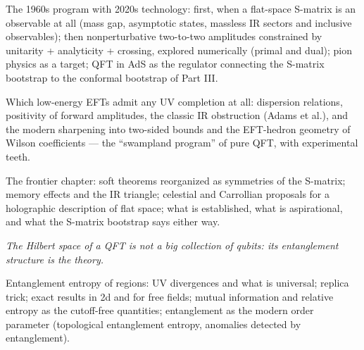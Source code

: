 The 1960s program with 2020s technology: first, when a flat-space S-matrix is an observable at all (mass gap, asymptotic states, massless IR sectors and inclusive observables); then nonperturbative two-to-two amplitudes constrained by unitarity + analyticity + crossing, explored numerically (primal and dual); pion physics as a target; QFT in AdS as the regulator connecting the S-matrix bootstrap to the conformal bootstrap of Part III.

Which low-energy EFTs admit any UV completion at all: dispersion relations, positivity of forward amplitudes, the classic IR obstruction (Adams et al.), and the modern sharpening into two-sided bounds and the EFT-hedron geometry of Wilson coefficients --- the ``swampland program'' of pure QFT, with experimental teeth.

The frontier chapter: soft theorems reorganized as symmetries of the S-matrix; memory effects and the IR triangle; celestial and Carrollian proposals for a holographic description of flat space; what is established, what is aspirational, and what the S-matrix bootstrap says either way.


\noin \emph{The Hilbert space of a QFT is not a big collection of qubits: its entanglement structure is the theory.}

Entanglement entropy of regions: UV divergences and what is universal; replica trick; exact results in 2d and for free fields; mutual information and relative entropy as the cutoff-free quantities; entanglement as the modern order parameter (topological entanglement entropy, anomalies detected by entanglement).

